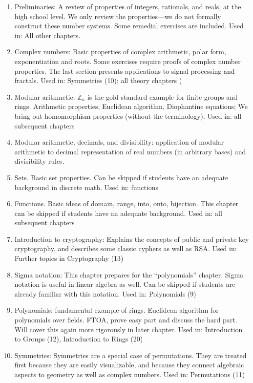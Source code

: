 \begin{enumerate}
\item
Preliminaries: A review of properties of integers, rationals, and reals, at the high school level. We only review the properties—we do not formally construct these number systems. Some remedial exercises are included.  Used in: All other chapters.
\item
Complex numbers: Basic properties of complex arithmetic, polar form, exponentiation and roots. Some exercises require proofs of complex number properties.  The last section presents applications to signal processing and fractals. Used in: Symmetries (10); all theory chapters (  
\item
Modular arithmetic:  ${\mathbb Z}_n$ is the  gold-standard example for finite groups and rings.  Arithmetic properties, Euclidean algorithm, Diophantine equations; We bring out homomorphism properties (without the terminology).  Used in: all subsequent chapters
\item
Modular arithmetic, decimals, and divisibility: application of modular arithmetic to decimal representation of real numbers (in arbitrary bases) and divisibility rules. 
\item
Sets.  Basic set properties. Can be skipped if students have an adequate background in discrete math. Used in: functions
\item
Functions. Basic ideas of domain, range, into, onto, bijection.  This chapter can be skipped if students have an adequate background.  Used in: all subsequent chapters
\item
Introduction to cryptography:  Explains the concepts of public and private key cryptography, and describes some classic cyphers as well as RSA. Used in:  Further topics in Cryptography (13)
\item
Sigma notation: This chapter prepares for the “polynomials” chapter.  Sigma notation is useful in linear algebra as well. Can be skipped if students are already familiar with this notation. Used in: Polynomials (9) 
\item
Polynomials: fundamental example of rings. Euclidean algorithm for polynomials over fields. FTOA, prove easy part and discuss the hard part.  Will cover this again more rigorously in later chapter. Used in:  Introduction to Groups (12), Introduction to Rings (20)
\item
Symmetries: Symmetries are a special case of permutations. They are treated first because they are easily visualizable, and because they connect algebraic aspects to geometry as well as complex numbers.  Used in:  Permutations (11)

\end{enumerate}
